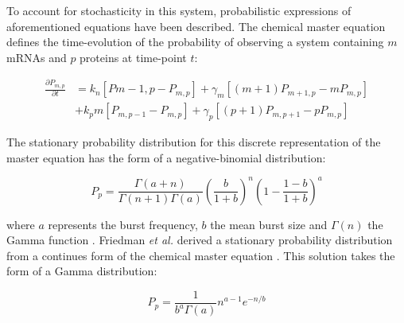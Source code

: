 \onehalfspacing
\noindent To account for stochasticity in this system, probabilistic expressions of aforementioned equations have been described. The chemical master equation defines the time-evolution of the probability of observing a system containing $m$ mRNAs and $p$ proteins at time-point $t$:

\begin{align}
\frac{\partial{}P_{m,p}}{\partial{}t}&=k_n\left[P{m-1,p}-P_{m,p}\right]+\gamma_m\left[(m+1)P_{m+1,p}-mP_{m,p}\right] \nonumber \\
&+k_pm\left[P_{m,p-1}-P_{m,p}\right]+\gamma_p\left[(p+1)P_{m,p+1}-pP_{m,p}\right]
\end{align}

\noindent The stationary probability distribution for this discrete representation of the master equation has the form of a negative-binomial distribution:

\begin{equation}
P_p=\frac{\Gamma(a+n)}{\Gamma(n+1)\Gamma(a)}\left(\frac{b}{1+b}\right)^n\left(1-\frac{1-b}{1+b}\right)^a
\end{equation}

\noindent where $a$ represents the burst frequency, $b$ the mean burst size and $\Gamma(n)$ the Gamma function \citep{Shahrezaei2008}. Friedman \textit{et al.} derived a stationary probability distribution from a continues form of the chemical master equation \citep{Friedman2006}. This solution takes the form of a Gamma distribution:

\begin{equation}
P_p=\frac{1}{b^a\Gamma(a)}n^{a-1} e^{-n/b}
\end{equation}

